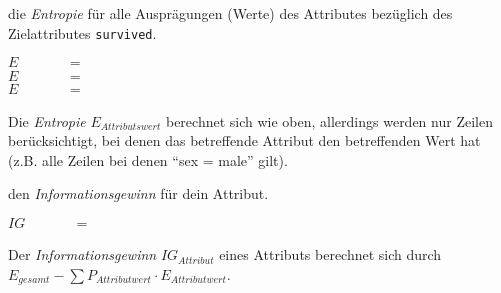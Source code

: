 \documentclass[10pt, a4paper]{scrartcl}
\begin{document}
\begin{aufgabe}
	 die \emph{Entropie} für alle Ausprägungen (Werte) des Attributes \linie[4cm] bezüglich des Zielattributes \texttt{survived}.
	
	\begin{center}
		$E_{\hspace{2cm}} = $\linie[12cm]\\[.4cm]
		$E_{\hspace{2cm}} = $\linie[12cm]\\[.4cm]
		$E_{\hspace{2cm}} = $\linie[12cm]
	\end{center}
	
	\begin{infobox}
		Die \emph{Entropie} $E_{Attributswert}$ berechnet sich wie oben, allerdings werden nur Zeilen berücksichtigt, bei denen das betreffende Attribut den betreffenden Wert hat (z.B. alle Zeilen bei denen \enquote{sex = male} gilt).
	\end{infobox}
\end{aufgabe}

\begin{aufgabe}
	 den \emph{Informationsgewinn} für dein Attribut.
	
	\begin{center}
		$IG_{\hspace{2cm}} = $\linie[12cm]
	\end{center}
	
	\begin{infobox}
		Der \emph{Informationsgewinn} $IG_{Attribut}$ eines Attributs berechnet sich durch $E_{gesamt} - \sum{P_{Attributwert}\cdot E_{Attributwert}}$.
	\end{infobox}
\end{aufgabe}
\end{document}
